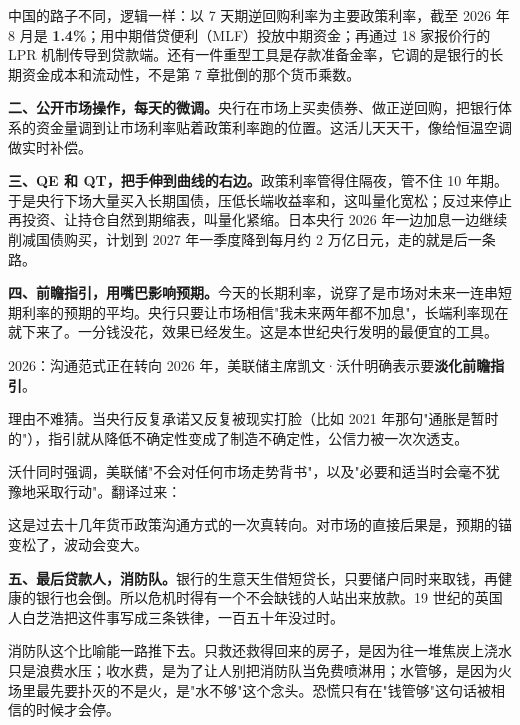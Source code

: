 中国的路子不同，逻辑一样：以 7 天期逆回购利率为主要政策利率，截至 2026 年 8 月是 \textbf{1.4\%}；用中期借贷便利（MLF）投放中期资金；再通过 18 家报价行的 LPR 机制传导到贷款端。还有一件重型工具是存款准备金率，它调的是银行的长期资金成本和流动性，不是第 7 章批倒的那个货币乘数。

\textbf{二、公开市场操作，每天的微调。}央行在市场上买卖债券、做正逆回购，把银行体系的资金量调到让市场利率贴着政策利率跑的位置。这活儿天天干，像给恒温空调做实时补偿。

\textbf{三、QE 和 QT，把手伸到曲线的右边。}政策利率管得住隔夜，管不住 10 年期。于是央行下场大量买入长期国债，压低长端收益率和，这叫量化宽松；反过来停止再投资、让持仓自然到期缩表，叫量化紧缩。日本央行 2026 年一边加息一边继续削减国债购买，计划到 2027 年一季度降到每月约 2 万亿日元，走的就是后一条路。

\textbf{四、前瞻指引，用嘴巴影响预期。}今天的长期利率，说穿了是市场对未来一连串短期利率的预期的平均。央行只要让市场相信"我未来两年都不加息"，长端利率现在就下来了。一分钱没花，效果已经发生。这是本世纪央行发明的最便宜的工具。

\begin{databox}{2026：沟通范式正在转向}
2026 年，美联储主席凯文·沃什明确表示要\textbf{淡化前瞻指引}。

理由不难猜。当央行反复承诺又反复被现实打脸（比如 2021 年那句"通胀是暂时的"），指引就从降低不确定性变成了制造不确定性，公信力被一次次透支。

沃什同时强调，美联储"不会对任何市场走势背书"，以及"必要和适当时会毫不犹豫地采取行动"。翻译过来：

这是过去十几年货币政策沟通方式的一次真转向。对市场的直接后果是，预期的锚变松了，波动会变大。

\end{databox}

\textbf{五、最后贷款人，消防队。}银行的生意天生借短贷长，只要储户同时来取钱，再健康的银行也会倒。所以危机时得有一个不会缺钱的人站出来放款。19 世纪的英国人白芝浩把这件事写成三条铁律，一百五十年没过时。

\begin{chainflow}
\chainarrow {}\chainarrow {}
\end{chainflow}

消防队这个比喻能一路推下去。只救还救得回来的房子，是因为往一堆焦炭上浇水只是浪费水压；收水费，是为了让人别把消防队当免费喷淋用；水管够，是因为火场里最先要扑灭的不是火，是"水不够"这个念头。恐慌只有在"钱管够"这句话被相信的时候才会停。

